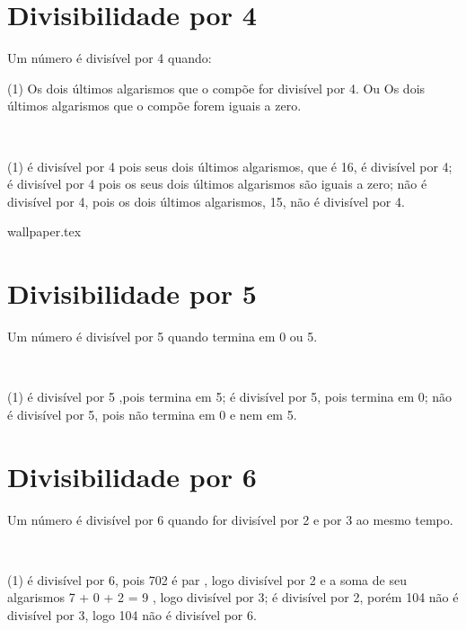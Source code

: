 \documentclass[10pt]{article}
\begin{document}
\section*{Divisibilidade por 4}
Um número é divisível por 4 quando:
\begin{tasks}(1)
    \task Os dois últimos algarismos que o compõe for divisível por 4. Ou
    \task Os dois últimos algarismos que o compõe forem iguais a zero. 
\end{tasks}


\begin{exemplo}~\\
   \begin{tasks}(1)
         é divisível por 4 pois seus dois últimos algarismos, que é 16, é divisível por 4;
         é divisível por 4 pois os seus dois últimos algarismos são iguais a zero;
         não é divisível por 4, pois os dois últimos algarismos, 15, não é divisível por 4. 
   \end{tasks}
\end{exemplo}

\newpage
{wallpaper.tex} %
\section*{Divisibilidade por 5}
Um número é divisível por 5 quando termina em 0 ou
5.
\begin{exemplo}~\\
   \begin{tasks}(1)
         é divisível por 5 ,pois termina em 5;
         é divisível por 5, pois termina em 0;
         não é divisível por 5, pois não termina em 0 e
nem em 5.
   \end{tasks}
\end{exemplo}

\section*{Divisibilidade por 6}
Um número é divisível por 6 quando for divisível por 2
e por 3 ao mesmo tempo. 
\begin{exemplo}~\\
   \begin{tasks}(1)    
     é divisível por 6, pois 702 é par , logo divisível
por 2 e a soma de seu algarismos 7 + 0 + 2 = 9 , logo divisível por 3;
     é divisível por 2, porém 104 não é divisível por 3, logo 104 não é divisível por 6. 
   \end{tasks}
\end{exemplo}
\end{document}
